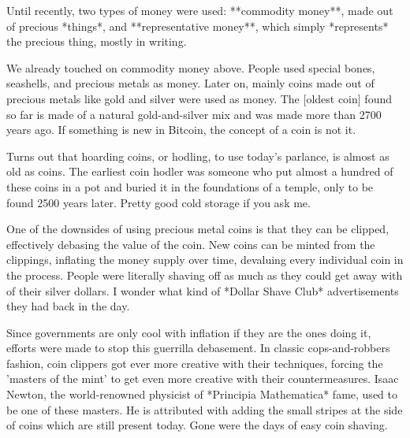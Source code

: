 
Until recently, two types of money were used: **commodity money**, made
out of precious *things*, and **representative money**, which simply
*represents* the precious thing, mostly in writing.

We already touched on commodity money above. People used special bones,
seashells, and precious metals as money. Later on, mainly coins made out
of precious metals like gold and silver were used as money. The [oldest
coin] found so far is made of a natural gold-and-silver mix and was made
more than 2700 years ago. If something is new in Bitcoin, the concept of
a coin is not it.


Turns out that hoarding coins, or hodling, to use today's parlance, is
almost as old as coins. The earliest coin hodler was someone who put
almost a hundred of these coins in a pot and buried it in the
foundations of a temple, only to be found 2500 years later. Pretty good
cold storage if you ask me.

One of the downsides of using precious metal coins is that they can be
clipped, effectively debasing the value of the coin. New coins can be
minted from the clippings, inflating the money supply over time,
devaluing every individual coin in the process. People were literally
shaving off as much as they could get away with of their silver dollars.
I wonder what kind of *Dollar Shave Club* advertisements they had back
in the day.

Since governments are only cool with inflation if they are the ones
doing it, efforts were made to stop this guerrilla debasement. In
classic cops-and-robbers fashion, coin clippers got ever more creative
with their techniques, forcing the 'masters of the mint' to get even
more creative with their countermeasures. Isaac Newton, the
world-renowned physicist of *Principia Mathematica* fame, used to be one
of these masters. He is attributed with adding the small stripes at the
side of coins which are still present today. Gone were the days of easy
coin shaving.



